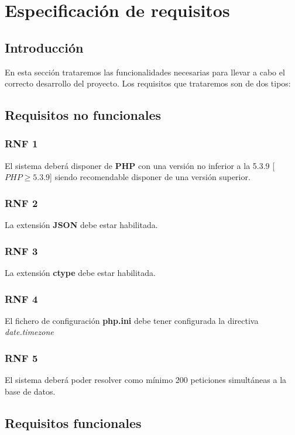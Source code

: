 \setcounter{chapter}{2}
\setcounter{section}{0}
\setcounter{subsection}{0}
\chapter{Especificación de requisitos}

\section{Introducción}
En esta sección trataremos las funcionalidades necesarias para llevar a cabo el correcto desarrollo del proyecto. Los requisitos que trataremos son de dos tipos:

\section{Requisitos no funcionales}

\subsection{RNF 1}

\noindent
El sistema deberá disponer de \textbf{PHP} con una versión no inferior a la 5.3.9 [$ PHP \geq 5.3.9 $] siendo recomendable disponer de una versión superior.

\subsection{RNF 2}

\noindent
La extensión \textbf{JSON} debe estar habilitada.

\subsection{RNF 3}

\noindent
La extensión \textbf{ctype} debe estar habilitada.

\subsection{RNF 4}

\noindent
El fichero de configuración \textbf{php.ini} debe tener configurada la directiva \textit{date.timezone}

\subsection{RNF 5}

\noindent
El sistema deberá poder resolver como mínimo 200 peticiones simultáneas a la base de datos.

\section{Requisitos funcionales}
